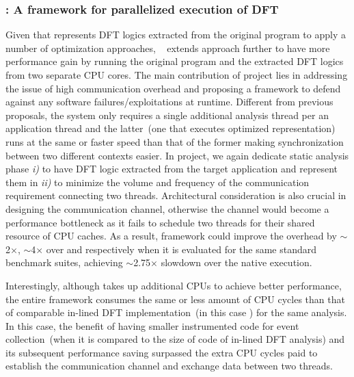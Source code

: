 \documentclass[letterpaper, 10pt]{article}
\begin{document}
\begin{small}
\subsubsection*{\SR: A framework for parallelized execution of DFT}
%
Given that \TFA represents DFT logics extracted from the original program to
apply a number of optimization approaches, \SR~\cite{sreplica:2013ccs} extends
\TFA approach further to have more performance gain by running the original
program and the extracted DFT logics from two separate CPU cores.
%
%
The main contribution of \SR project lies in addressing the issue of high
communication overhead and proposing a framework  to defend against any
software failures/exploitations at runtime. Different from previous proposals,
the system only requires a single additional analysis thread per an application
thread and the latter~(one that executes optimized \TFA representation) runs at
the same or faster speed than that of the former making synchronization between
two different contexts easier.
%
In \SR project, we again dedicate static analysis phase {\it i)} to have DFT
logic extracted from the target application and represent them in \TFA
\xspace{\it ii)} to minimize the volume and frequency of the communication
requirement connecting two threads.
%
Architectural consideration is also crucial in designing the communication
channel, otherwise the channel would become a performance bottleneck as it
fails to schedule two threads for their shared resource of CPU caches.
%
As a result, \SR framework could improve the overhead by $\sim$2$\times$,
$\sim$4$\times$ over \TFA and \libdft respectively when it is evaluated for the
same standard benchmark suites, achieving $\sim$2.75$\times$ slowdown over the
native execution.

Interestingly, although \SR takes up additional CPUs to achieve better
performance, the entire framework consumes the same or less amount of CPU
cycles than that of comparable in-lined DFT implementation~(in this case \TFA)
for the same analysis.
%
In this case, the benefit of having smaller instrumented code for event
collection~(when it is compared to the size of code of in-lined DFT analysis)
and its subsequent performance saving surpassed the extra CPU cycles paid to
establish the communication channel and exchange data between two threads.


\end{small}
\end{document}
